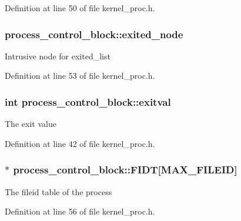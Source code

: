Definition at line 50 of file kernel\+\_\+proc.\+h.

\subsubsection[{\texorpdfstring{exited\+\_\+node}{exited_node}}]{ process\+\_\+control\+\_\+block\+::exited\+\_\+node}\hypertarget{structprocess__control__block_a9e0d93783a89bd92f39243353f04a27e}{}\label{structprocess__control__block_a9e0d93783a89bd92f39243353f04a27e}
Intrusive node for {\ttfamily exited\+\_\+list} 

Definition at line 53 of file kernel\+\_\+proc.\+h.

\subsubsection[{\texorpdfstring{exitval}{exitval}}]{\setlength{\rightskip}{0pt plus 5cm}int process\+\_\+control\+\_\+block\+::exitval}\hypertarget{structprocess__control__block_add9b4f6d506a3538be7b53411e94fd28}{}\label{structprocess__control__block_add9b4f6d506a3538be7b53411e94fd28}
The exit value 

Definition at line 42 of file kernel\+\_\+proc.\+h.

\subsubsection[{\texorpdfstring{F\+I\+DT}{FIDT}}]{$\ast$ process\+\_\+control\+\_\+block\+::\+F\+I\+DT\mbox{[}{\bf M\+A\+X\+\_\+\+F\+I\+L\+E\+ID}\mbox{]}}\hypertarget{structprocess__control__block_aad72d85bd79a3100a497d11630a38977}{}\label{structprocess__control__block_aad72d85bd79a3100a497d11630a38977}
The fileid table of the process 

Definition at line 56 of file kernel\+\_\+proc.\+h.

